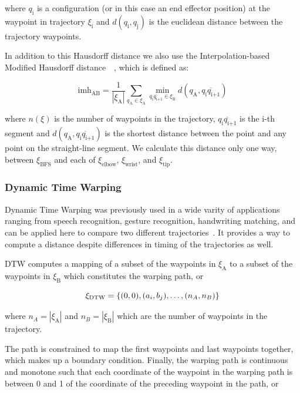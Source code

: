 \documentclass[letterpaper, 10 pt, conference]{ieeeconf}  %
\newcommand{\tj}[1]{\ensuremath{\xi_\text{#1}}}
\begin{document}
where $q_\text{i}$ is a configuration (or in this case an end effector position) at the waypoint in trajectory $\xi_\text{i}$ and $d(q_\text{i}, q_\text{j})$ is the euclidean distance between the trajectory waypoints.

In addition to this Hausdorff distance we also use the Interpolation-based Modified Hausdorff distance~\cite{dubuisson1994modified}~\cite{chen2013dynamic}, which is defined as:

\begin{equation}
\text{imh}_\text{AB} = \frac{1}{|\xi_\text{A}|} \sum_{q_\text{A} \in \xi_\text{A}} \min_{\overline{q_\text{i}q_\text{i+1}} \in \xi_\text{B}} d(q_\text{A}, \overline{q_\text{i}q_\text{i+1}})
\end{equation}

where $n(\xi)$ is the number of waypoints in the trajectory, $\overline{q_\text{i}q_\text{i+1}}$ is the i-th segment and $d(q_\text{A}, \overline{q_\text{i}q_\text{i+1}})$ is the shortest distance between the point and any point on the straight-line segment. We calculate this distance only one way, between $\xi_{\text{BFS}}$ and each of $\xi_\text{elbow}$, $\xi_\text{wrist}$, and $\xi_\text{tip}$.

\subsubsection{Dynamic Time Warping}

Dynamic Time Warping was previously used in a wide varity of applications ranging from speech recognition, gesture recognition, handwriting matching, and can be applied here to compare two different trajectories~\cite{senin2008dynamic}\cite{chen2013dynamic}. It provides a way to compute a distance despite differences in timing of the trajectories as well.

DTW computes a mapping of a subset of the waypoints in $\xi_\text{A}$ to a subset of the waypoints in $\xi_\text{B}$ which constitutes the warping path, or

\begin{equation}
\xi_\text{DTW} = \{ (0, 0), (a_i, b_j), \mathellipsis ,(n_A, n_B) \}
\end{equation}

where $n_A = |\tj{A}|$ and $n_B = |\tj{B}|$ which are the number of waypoints in the trajectory.

The path is constrained to map the first waypoints and last waypoints together, which makes up a boundary condition. Finally, the warping path is continuous and monotone such that each coordinate of the waypoint in the warping path is between 0 and 1 of the coordinate of the preceding waypoint in the path, or
\end{document}
